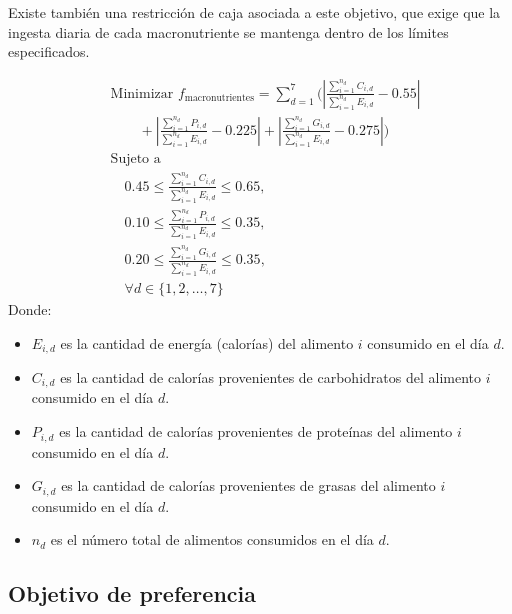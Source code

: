 Existe también una restricción de caja asociada a este objetivo, que exige que la ingesta diaria de cada macronutriente se mantenga dentro de los límites especificados.
\begin{small}
    \[
    \begin{aligned}
    & \text{Minimizar } f_{\text{macronutrientes}} = \sum_{d=1}^{7} \Bigg( \left| \frac{\sum_{i=1}^{n_d} C_{i,d}}{\sum_{i=1}^{n_d} E_{i,d}} - 0.55 \right| \\
    & \qquad + \left| \frac{\sum_{i=1}^{n_d} P_{i,d}}{\sum_{i=1}^{n_d} E_{i,d}} - 0.225 \right| + \left| \frac{\sum_{i=1}^{n_d} G_{i,d}}{\sum_{i=1}^{n_d} E_{i,d}} - 0.275 \right| \Bigg) \\
    & \text{Sujeto a } \\
    & \quad 0.45 \leq \frac{\sum_{i=1}^{n_d} C_{i,d}}{\sum_{i=1}^{n_d} E_{i,d}} \leq 0.65, \\
    & \quad 0.10 \leq \frac{\sum_{i=1}^{n_d} P_{i,d}}{\sum_{i=1}^{n_d} E_{i,d}} \leq 0.35, \\
    & \quad 0.20 \leq \frac{\sum_{i=1}^{n_d} G_{i,d}}{\sum_{i=1}^{n_d} E_{i,d}} \leq 0.35, \\
    & \quad \forall d \in \{1, 2, \ldots, 7\}
    \end{aligned}
    \]
\newpage
        Donde:
        \begin{itemize}
        \item \( E_{i,d} \) es la cantidad de energía (calorías) del alimento \( i \) consumido en el día \( d \).
        \item \( C_{i,d} \) es la cantidad de calorías provenientes de carbohidratos del alimento \( i \) consumido en el día \( d \).
        \item \( P_{i,d} \) es la cantidad de calorías provenientes de proteínas del alimento \( i \) consumido en el día \( d \).
        \item \( G_{i,d} \) es la cantidad de calorías provenientes de grasas del alimento \( i \) consumido en el día \( d \).
        \item \( n_d \) es el número total de alimentos consumidos en el día \( d \).
        \end{itemize}
\end{small}

\subsection{Objetivo de preferencia}

